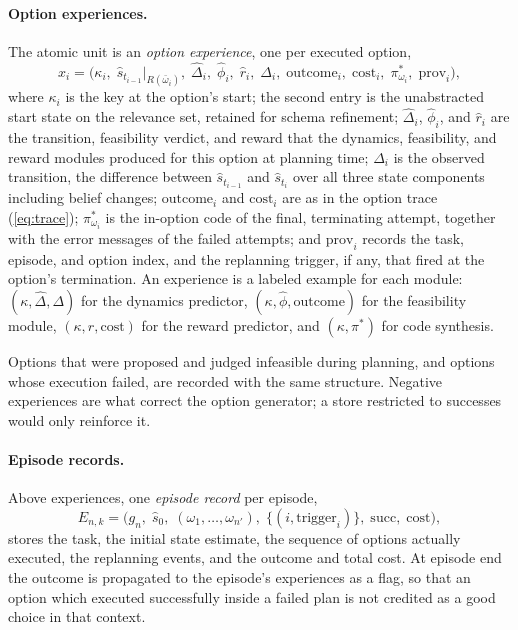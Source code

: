 \documentclass[11pt]{article}
\newcommand{\Rel}{R}
\newcommand{\shat}{\hat{s}}
\newcommand{\prov}{\mathrm{prov}}
\begin{document}
\paragraph{Option experiences.}
The atomic unit is an \emph{option experience}, one per executed option,
\begin{equation}
x_i=\big(\kappa_i,\;\shat_{t_{i-1}}|_{\Rel(\bar\omega_i)},\;\hat\Delta_i,\;\hat\phi_i,\;\hat r_i,\;\Delta_i,\;\mathrm{outcome}_i,\;\mathrm{cost}_i,\;\pi^{\ast}_{\omega_i},\;\prov_i\big),
\label{eq:experience}
\end{equation}
where $\kappa_i$ is the key at the option's start; the second entry is the unabstracted start state on the relevance set, retained for schema refinement; $\hat\Delta_i$, $\hat\phi_i$, and $\hat r_i$ are the transition, feasibility verdict, and reward that the dynamics, feasibility, and reward modules produced for this option at planning time; $\Delta_i$ is the observed transition, the difference between $\shat_{t_{i-1}}$ and $\shat_{t_i}$ over all three state components including belief changes; $\mathrm{outcome}_i$ and $\mathrm{cost}_i$ are as in the option trace (\ref{eq:trace}); $\pi^\ast_{\omega_i}$ is the in-option code of the final, terminating attempt, together with the error messages of the failed attempts; and $\prov_i$ records the task, episode, and option index, and the replanning trigger, if any, that fired at the option's termination. An experience is a labeled example for each module: $(\kappa,\hat\Delta,\Delta)$ for the dynamics predictor, $(\kappa,\hat\phi,\mathrm{outcome})$ for the feasibility module, $(\kappa,\hat r,\mathrm{cost})$ for the reward predictor, and $(\kappa,\pi^\ast)$ for code synthesis.

Options that were proposed and judged infeasible during planning, and options whose execution failed, are recorded with the same structure. Negative experiences are what correct the option generator; a store restricted to successes would only reinforce it.

\paragraph{Episode records.}
Above experiences, one \emph{episode record} per episode,
\begin{equation}
E_{n,k}=\big(g_n,\;\shat_0,\;(\omega_1,\dots,\omega_{n'}),\;\{(i,\text{trigger}_i)\},\;\mathrm{succ},\;\mathrm{cost}\big),
\label{eq:episode}
\end{equation}
stores the task, the initial state estimate, the sequence of options actually executed, the replanning events, and the outcome and total cost. At episode end the outcome is propagated to the episode's experiences as a flag, so that an option which executed successfully inside a failed plan is not credited as a good choice in that context.
\end{document}

